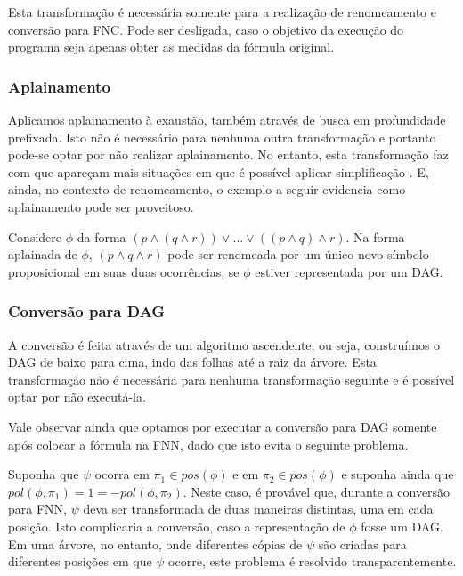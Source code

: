 Esta transformação é necessária somente para a realização de renomeamento e conversão para FNC. Pode ser desligada, caso o objetivo da execução do programa seja apenas obter as medidas da fórmula original.

\subsubsection{Aplainamento}

\indent

Aplicamos aplainamento à exaustão, também através de busca em profundidade prefixada. Isto não é necessário para nenhuma outra transformação e portanto pode-se optar por não realizar aplainamento. No entanto, esta transformação faz com que apareçam mais situações em que é possível aplicar simplificação \cite{sebastiani2009automated}. E, ainda, no contexto de renomeamento, o exemplo a seguir evidencia como aplainamento pode ser proveitoso.

Considere $\phi$ da forma $(p \wedge (q \wedge r)) \vee ... \vee ((p \wedge q) \wedge r)$. Na forma aplainada de $\phi$, $(p \wedge q \wedge r)$ pode ser renomeada por um único novo símbolo proposicional em suas duas ocorrências, se $\phi$ estiver representada por um DAG.

\subsubsection{Conversão para DAG}

\indent

A conversão é feita através de um algoritmo ascendente, ou seja, construímos o DAG de baixo para cima, indo das folhas até a raiz da árvore. Esta transformação não é necessária para nenhuma transformação seguinte e é possível optar por não executá-la.

Vale observar ainda que optamos por executar a conversão para DAG somente após colocar a fórmula na FNN, dado que isto evita o seguinte problema.

Suponha que $\psi$ ocorra em $\pi_1 \in pos(\phi)$ e em $\pi_2 \in pos(\phi)$ e suponha ainda que $pol(\phi,\pi_1) = 1 = -pol(\phi,\pi_2)$. Neste caso, é provável que, durante a conversão para FNN, $\psi$ deva ser transformada de duas maneiras distintas, uma em cada posição. Isto complicaria a conversão, caso a representação de $\phi$ fosse um DAG. Em uma árvore, no entanto, onde diferentes cópias de $\psi$ são criadas para diferentes posições em que $\psi$ ocorre, este problema é resolvido transparentemente.

